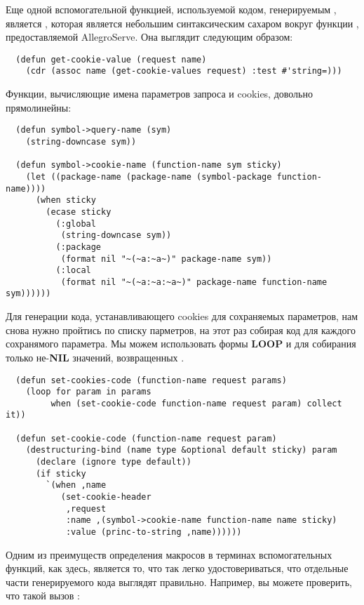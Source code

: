 Еще одной вспомогательной функцией, используемой кодом, генерируемым ,
является , которая является небольшим синтаксическим сахаром вокруг
функции , предоставляемой AllegroServe. Она выглядит следующим
образом:

\begin{lstlisting}
  (defun get-cookie-value (request name)
    (cdr (assoc name (get-cookie-values request) :test #'string=)))
\end{lstlisting}

Функции, вычисляющие имена параметров запроса и cookies, довольно прямолинейны:

\begin{lstlisting}
  (defun symbol->query-name (sym)
    (string-downcase sym))

  (defun symbol->cookie-name (function-name sym sticky)
    (let ((package-name (package-name (symbol-package function-name))))
      (when sticky
        (ecase sticky
          (:global
           (string-downcase sym))
          (:package
           (format nil "~(~a:~a~)" package-name sym))
          (:local 
           (format nil "~(~a:~a:~a~)" package-name function-name sym))))))
\end{lstlisting}

Для генерации кода, устанавливающего cookies для сохраняемых параметров, нам снова нужно
пройтись по списку парметров, на этот раз собирая код для каждого сохранямого
параметра. Мы можем использовать формы \textbf{LOOP}  и  для
собирания только не-\textbf{NIL} значений, возвращенных .

\begin{lstlisting}
  (defun set-cookies-code (function-name request params)
    (loop for param in params
         when (set-cookie-code function-name request param) collect it))

  (defun set-cookie-code (function-name request param)
    (destructuring-bind (name type &optional default sticky) param
      (declare (ignore type default))
      (if sticky
        `(when ,name 
           (set-cookie-header 
            ,request
            :name ,(symbol->cookie-name function-name name sticky)
            :value (princ-to-string ,name))))))
\end{lstlisting}

Одним из преимуществ определения макросов в терминах вспомогательных функций, как здесь,
является то, что так легко удостовериваться, что отдельные части генерируемого кода
выглядят правильно. Например, вы можете проверить, что такой вызов :

